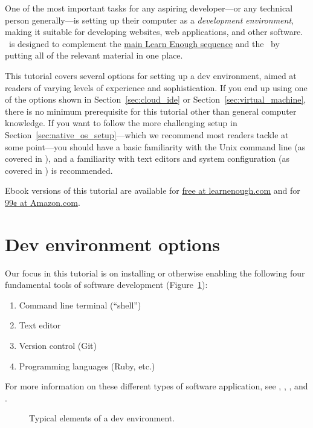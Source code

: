 One of the most important tasks for any aspiring developer---or any technical person generally---is setting up their computer as a \emph{development environment}, making it suitable for developing websites, web applications, and other software. \ledev\ is designed to complement the \href{http://www.learnenough.com/tutorials}{main Learn Enough sequence} and the \rort\ by putting all of the relevant material in one place.

This tutorial covers several options for setting up a dev environment, aimed at readers of varying levels of experience and sophistication. If you end up using one of the options shown in Section~\ref{sec:cloud_ide} or Section~\ref{sec:virtual_machine}, there is no minimum prerequisite for this tutorial other than general computer knowledge. If you want to follow the more challenging setup in Section~\ref{sec:native_os_setup}---which we recommend most readers tackle at some point---you should have a basic familiarity with the Unix command line (as covered in \lecl), and a familiarity with text editors and system configuration (as covered in ) is recommended.

Ebook versions of this tutorial are available for \href{https://www.softcover.io/email-capture/28fdb94f/learn_enough_dev_environment}{free at learnenough.com} and for \href{https://www.amazon.com/Learn-Enough-Dev-Environment-Dangerous-ebook/dp/B01MTEQJ6E}{99¢ at Amazon.com}.

\section{Dev environment options} %
\label{sec:dev_environment_options}

Our focus in this tutorial is on installing or otherwise enabling the following four fundamental tools of software development (Figure~\ref{fig:dev_environment}):
\begin{enumerate}
  \item Command line terminal (``shell'')
  \item Text editor
  \item Version control (Git)
  \item Programming languages (Ruby, etc.)
\end{enumerate}
For more information on these different types of software application, see \lecl, , \leg, and \ler.

\begin{figure}
\begin{center}
\end{center}
\caption{Typical elements of a dev environment.\label{fig:dev_environment}}
\end{figure}

